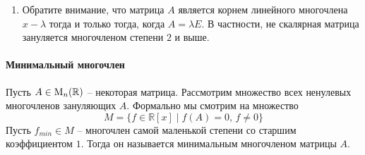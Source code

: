 \begin{enumerate}
\item Обратите внимание, что матрица $A$ является корнем линейного многочлена $x - \lambda$ тогда и только тогда, когда $A = \lambda E$.
В частности, не скалярная матрица зануляется многочленом степени $2$ и выше.
\end{enumerate}

\paragraph{Минимальный многочлен}

Пусть $A\in\operatorname{M}_{n}(\mathbb R)$ -- некоторая матрица.
Рассмотрим множество всех ненулевых многочленов зануляющих $A$.
Формально мы смотрим на множество
\[
M = \{f\in\mathbb R[x]\mid f(A)=0,\,f\neq 0\}
\]
Пусть $f_{min}\in M$ -- многочлен самой маленькой степени со старшим коэффициентом $1$.
Тогда он называется минимальным многочленом матрицы $A$.

